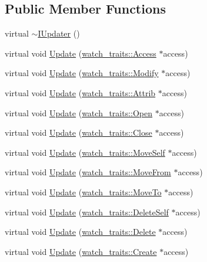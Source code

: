 \subsection*{Public Member Functions}
\begin{DoxyCompactItemize}
\item 
virtual \hyperlink{classmocha_1_1_i_updater_adb123b972b708aebd70dffaab6aaa35d}{$\sim$IUpdater} ()
\item 
virtual void \hyperlink{classmocha_1_1_i_updater_a7534463af580f55f0b299f5e9fd82367}{Update} (\hyperlink{structmocha_1_1watch__traits_1_1_access}{watch\_\-traits::Access} $\ast$access)
\item 
virtual void \hyperlink{classmocha_1_1_i_updater_a99f87c1ff978b034b5be7ab372e81a5b}{Update} (\hyperlink{structmocha_1_1watch__traits_1_1_modify}{watch\_\-traits::Modify} $\ast$access)
\item 
virtual void \hyperlink{classmocha_1_1_i_updater_a21c633bb813913e86dcc892f0f9e3e69}{Update} (\hyperlink{structmocha_1_1watch__traits_1_1_attrib}{watch\_\-traits::Attrib} $\ast$access)
\item 
virtual void \hyperlink{classmocha_1_1_i_updater_a18c9d990ea85c10d8ff0b400ca498d0f}{Update} (\hyperlink{structmocha_1_1watch__traits_1_1_open}{watch\_\-traits::Open} $\ast$access)
\item 
virtual void \hyperlink{classmocha_1_1_i_updater_a62ff71ed371e4d3fbd791720aee6a45d}{Update} (\hyperlink{structmocha_1_1watch__traits_1_1_close}{watch\_\-traits::Close} $\ast$access)
\item 
virtual void \hyperlink{classmocha_1_1_i_updater_a8de44af02cf7872aca809afd7af5d9a7}{Update} (\hyperlink{structmocha_1_1watch__traits_1_1_move_self}{watch\_\-traits::MoveSelf} $\ast$access)
\item 
virtual void \hyperlink{classmocha_1_1_i_updater_a1fa1e439df09761e24de035d9251238d}{Update} (\hyperlink{structmocha_1_1watch__traits_1_1_move_from}{watch\_\-traits::MoveFrom} $\ast$access)
\item 
virtual void \hyperlink{classmocha_1_1_i_updater_af23ffae4961316472bcc8013e71e3f11}{Update} (\hyperlink{structmocha_1_1watch__traits_1_1_move_to}{watch\_\-traits::MoveTo} $\ast$access)
\item 
virtual void \hyperlink{classmocha_1_1_i_updater_a37df53aa438d78a64820721026c207b0}{Update} (\hyperlink{structmocha_1_1watch__traits_1_1_delete_self}{watch\_\-traits::DeleteSelf} $\ast$access)
\item 
virtual void \hyperlink{classmocha_1_1_i_updater_a6d0fc3c6daf45ffb33d471ae85103fc2}{Update} (\hyperlink{structmocha_1_1watch__traits_1_1_delete}{watch\_\-traits::Delete} $\ast$access)
\item 
virtual void \hyperlink{classmocha_1_1_i_updater_aa8dea57f43f47a5356e2eb765f15510a}{Update} (\hyperlink{structmocha_1_1watch__traits_1_1_create}{watch\_\-traits::Create} $\ast$access)
\end{DoxyCompactItemize}


